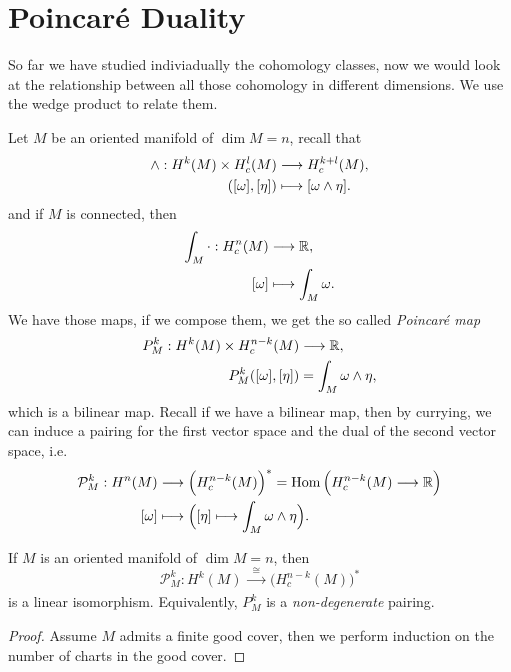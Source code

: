 \section[Poincar\'e Duality]{Poincar\'e Duality}

So far we have studied indiviadually the cohomology classes, now we would look at the relationship between all those cohomology in different dimensions. We use the wedge product to relate them.

Let \(M\) be an oriented manifold of \(\dim M = n\), recall that \begin{align*}
    \wedge: H^k(M)\times H_c^l(M)&\longrightarrow H_c^{k+l}(M),\\
     ([\omega],[\eta])&\longmapsto [\omega\wedge\eta].
\end{align*}
and if \(M\) is connected, then \begin{align*}
    \int_M\cdot: H_c^n(M) &\longrightarrow \R,\\
    [\omg] &\longmapsto \int_M\omg.
\end{align*}
We have those maps, if we compose them, we get the so called \emph{Poincaré map} \begin{align*}
    P_M^k: H^k(M)\times H_c^{n-k}(M) &\longrightarrow \mathbb{R},\\
    P_M^k([\omega],[\eta]) &= \int_M \omega\wedge\eta,
\end{align*} which is a bilinear map. Recall if we have a bilinear map, then by currying, we can induce a pairing for the first vector space and the dual of the second vector space, i.e.\ \begin{align*}
    \mathcal{P}_M^k: H^n(M) &\longrightarrow \Big(H_c^{n-k}(M)\Big)^*
    = \operatorname{Hom}\Big(H_c^{n-k}(M)\longrightarrow\R\Big) \\
    [\omg] &\longmapsto \Big([\eta]\longmapsto \int_M \omg\wed\eta\Big).
\end{align*}

\begin{theorem}
    If \(M\) is an oriented manifold of \(\dim M = n\), then \[
        \mathcal{P}_M^k: H^k(M)\xrightarrow[\hspace{2em}]{\cong} \Big(H_c^{n-k}(M)\Big)^*
    \] is a linear isomorphism. Equivalently, \(P_M^k\) is a \emph{non-degenerate} pairing.
\end{theorem}
\begin{proof}
    Assume \(M\) admits a finite good cover, then we perform induction on the number of charts in the good cover.
\end{proof}

